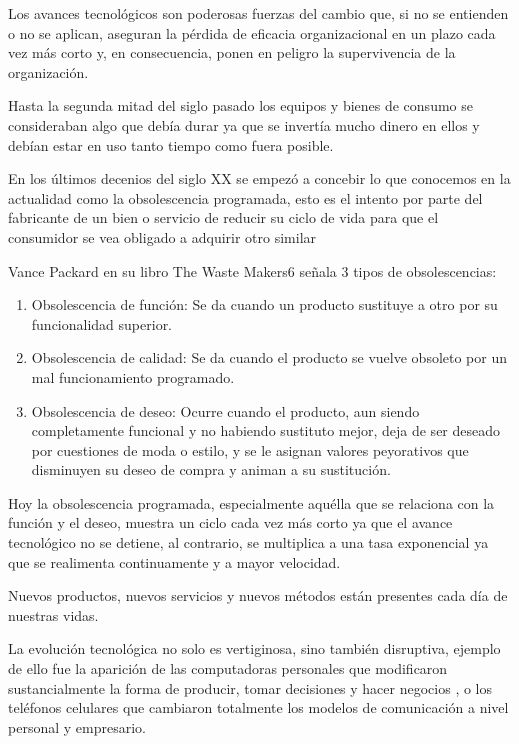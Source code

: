 \documentclass[a4paper, 12pt]{article}
\begin{document}
Los avances tecnológicos son poderosas fuerzas del cambio que, si no se entienden o no se aplican, aseguran la pérdida de eficacia organizacional en un plazo cada vez más corto y, en consecuencia, ponen en peligro la supervivencia de la organización.

Hasta la segunda mitad del siglo pasado los equipos y bienes de consumo se consideraban algo que debía durar ya que se invertía mucho dinero en ellos y debían estar en uso tanto tiempo como fuera posible.

En los últimos decenios del siglo XX se empezó a concebir lo que conocemos en la actualidad como la obsolescencia programada, esto es el intento por parte del fabricante de un bien o servicio de reducir su ciclo de vida para que el consumidor se vea obligado a adquirir otro similar

Vance Packard{\cite{Packard1964}} en su libro The Waste Makers6 señala 3 tipos de obsolescencias:

\begin{enumerate}
\item Obsolescencia de función: Se da cuando un producto sustituye a otro por su funcionalidad superior.
\item Obsolescencia de calidad: Se da cuando el producto se vuelve obsoleto por un mal funcionamiento programado.
\item Obsolescencia de deseo: Ocurre cuando el producto, aun siendo completamente funcional y no habiendo sustituto mejor, deja de ser deseado por cuestiones de moda o estilo, y se le asignan valores peyorativos que disminuyen su deseo de compra y animan a su sustitución.
\end{enumerate}

Hoy la obsolescencia programada, especialmente aquélla que se relaciona con la función y el deseo, muestra un ciclo cada vez más corto ya que el avance tecnológico no se detiene, al contrario, se multiplica a una tasa exponencial ya que se realimenta continuamente y a mayor velocidad.

Nuevos productos, nuevos servicios y nuevos métodos están presentes cada día de nuestras vidas.

La evolución tecnológica no solo es vertiginosa, sino también disruptiva, ejemplo de ello fue la aparición de las computadoras personales que modificaron sustancialmente la forma de producir, tomar decisiones y hacer negocios , o los teléfonos celulares que cambiaron totalmente los modelos de comunicación a nivel personal y empresario.
\end{document}
